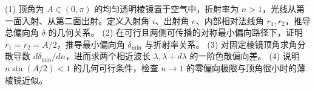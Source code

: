 (1) 顶角为 \(A\in(0,\pi)\) 的均匀透明棱镜置于空气中，折射率为 \(n>1\)，光线从第一面入射、从第二面出射。定义入射角 \(i\)、出射角 \(e\)、内部相对法线角 \(r_1,r_2\)，推导总偏向角 \(\delta\) 的几何关系。
(2) 在可行且两侧可传播的对称最小偏向路径下，证明 \(r_1=r_2=A/2\)，推导最小偏向角 \(\delta_{\min}\) 与折射率关系。
(3) 对固定棱镜顶角求角分散导数 \(d\delta_{\min}/dn\)，进而求两个相近波长 \(\lambda,\lambda+d\lambda\) 的一阶色散偏向差。
(4) 说明 \(n\sin(A/2)<1\) 的几何可行条件，检查 \(n\to1\) 的零偏向极限与顶角很小时的薄棱镜近似。
